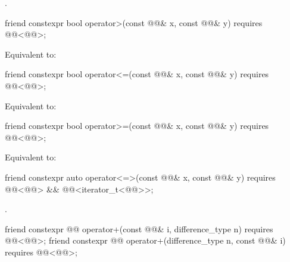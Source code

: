 \begin{itemdescr}
\pnum
\returns
{}.
\end{itemdescr}

\begin{itemdecl}
friend constexpr bool operator>(const @@& x, const @@& y)
  requires @@<@@>;
\end{itemdecl}

\begin{itemdescr}
\pnum
\effects
Equivalent to: 
\end{itemdescr}

\begin{itemdecl}
friend constexpr bool operator<=(const @@& x, const @@& y)
  requires @@<@@>;
\end{itemdecl}

\begin{itemdescr}
\pnum
\effects
Equivalent to: 
\end{itemdescr}

\begin{itemdecl}
friend constexpr bool operator>=(const @@& x, const @@& y)
  requires @@<@@>;
\end{itemdecl}

\begin{itemdescr}
\pnum
\effects
Equivalent to: 
\end{itemdescr}

\begin{itemdecl}
friend constexpr auto operator<=>(const @@& x, const @@& y)
  requires @@<@@> &&
           @@<iterator_t<@@>>;
\end{itemdecl}

\begin{itemdescr}
\pnum
\returns
{}.
\end{itemdescr}

\begin{itemdecl}
friend constexpr @@ operator+(const @@& i, difference_type n)
  requires @@<@@>;
friend constexpr @@ operator+(difference_type n, const @@& i)
  requires @@<@@>;
\end{itemdecl}

